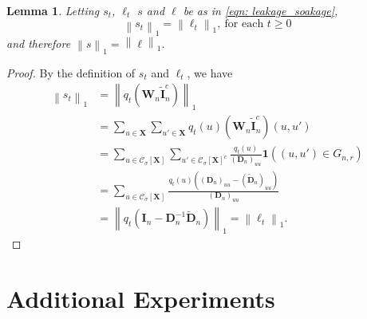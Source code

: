 \documentclass{article}
\newcommand{\norm}[1]{\left\lVert#1\right\rVert}
\newcommand{\1}{\mathbf{1}}
\newcommand{\Xbf}{\mathbf{X}}
\newcommand{\Wbf}{\mathbf{W}}
\newcommand{\Dbf}{\mathbf{D}}
\newcommand{\Ibf}[1]{\mathbf{I}_{#1}}
\newcommand{\Cset}{\mathcal{C}}
\newcommand{\Csig}{\Cset_{\sigma}}
\theoremstyle{aldenthm}
\newtheorem{lemma}{Lemma}
\begin{document}
\begin{lemma}
	\label{lem: total_leakage_equal_total_soakage}
	Letting $s_t$, $\ell_t$ $s$ and $\ell$ be as in \eqref{eqn: leakage_soakage},
	\begin{equation*}
	\norm{s_t}_1 = \norm{\ell_t}_1,~ \textrm{for each $t \geq 0$}
	\end{equation*}
	and therefore $\norm{s}_1 = \norm{\ell}_1$. 
\end{lemma}
\begin{proof}
	By the definition of $s_t$ and $\ell_t$, we have
	\begin{align*}
	\norm{s_t}_1 & = \norm{q_t (\Wbf_n \widetilde{\mathbf{I}}_n^c)}_1 \\
	& = \sum_{u \in \Xbf} \sum_{u' \in \Xbf} q_t(u) (\Wbf_n \widetilde{\mathbf{I}}_n^c)(u, u') \\
	& = \sum_{u \in\Csig[\Xbf]} \sum_{u' \in \Csig[\Xbf]^c} \frac{q_t(u)}{(\Dbf_n)_{uu}} \1((u,u') \in G_{n,r}) \\
	& = \sum_{u \in \Csig[\Xbf]} \frac{q_t(u) \left((\Dbf_n)_{uu} - (\widetilde{\Dbf}_n)_{uu} \right)}{(\Dbf_n)_{uu}} \\
	& = \norm{q_t (\Ibf{n} - \Dbf_n^{-1} \widetilde{\Dbf}_n)}_1 = \norm{\ell_t}_1.
	\end{align*}
\end{proof}

\section{Additional Experiments}
\end{document}
